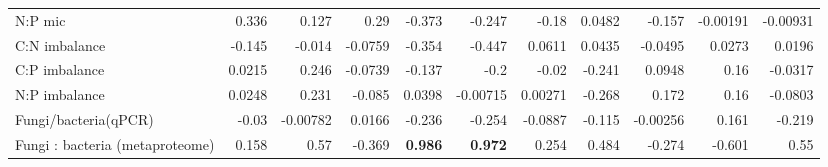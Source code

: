 \documentclass[10pt]{article}
\begin{document}
\begin{flushleft}
\begin{landscape}
\begin{table}[h!]
\begin{center}
{\begin{tabular}{lrrrrrrrrrr}
  N:P mic & 0.336 & 0.127 & 0.29 & -0.373 & -0.247 & -0.18 & 0.0482 & -0.157 & -0.00191 & -0.00931 \\ 
  C:N imbalance & -0.145 & -0.014 & -0.0759 & -0.354 & -0.447 & 0.0611 & 0.0435 & -0.0495 & 0.0273 & 0.0196 \\ 
  C:P imbalance & 0.0215 & 0.246 & -0.0739 & -0.137 & -0.2 & -0.02 & -0.241 & 0.0948 & 0.16 & -0.0317 \\ 
  N:P imbalance & 0.0248 & 0.231 & -0.085 & 0.0398 & -0.00715 & 0.00271 & -0.268 & 0.172 & 0.16 & -0.0803 \\ 
  Fungi/bacteria(qPCR) & -0.03 & -0.00782 & 0.0166 & -0.236 & -0.254 & -0.0887 & -0.115 & -0.00256 & 0.161 & -0.219 \\ 
  Fungi : bacteria (metaproteome) & 0.158 & 0.57 & -0.369 & \textbf{ 0.986 } & \textbf{ 0.972 } & 0.254 & 0.484 & -0.274 & -0.601 & 0.55 \\ 
   \hline
\end{tabular}
}
\end{center}
\end{table}\end{landscape}


\end{flushleft}
\end{document}
